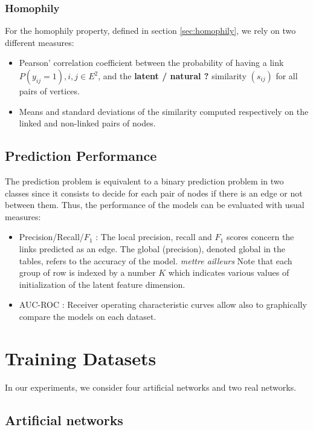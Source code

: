 \documentclass[a4paper, 12pt]{article}
\begin{document}
\subsubsection{Homophily}

For the homophily property, defined in section \ref{sec:homophily}, we rely on two different measures:

\begin{itemize}
    \item  Pearson' correlation coefficient between the probability of having a link $P(y_{ij}=1),  i, j \in E^2 $, and the  \textbf{latent / natural ?} similarity $(s_{ij})$ for all pairs of vertices. 
    \item  Means and standard deviations of the similarity computed respectively on the linked and non-linked pairs of nodes.
\end{itemize}

\subsection{Prediction Performance}
The prediction problem is equivalent to a binary prediction problem in two classes since it consists to decide for each pair of nodes if there is an edge or not between them. 
Thus, the performance of the models can be evaluated with usual measures:

\begin{itemize}

\item Precision/Recall/$F_1$ :  The local precision, recall and $F_1$ scores concern the links predicted as an edge.  The global (precision), denoted global in the tables, refers to the accuracy of the model. 
\textit{mettre ailleurs} Note that each group of row is indexed by  a number $K$ which indicates various values of initialization of the latent feature dimension.
\item AUC-ROC : Receiver operating characteristic curves allow also to graphically compare the  models on each dataset.
\end{itemize}

\section{Training Datasets}

In our experiments, we consider four artificial networks and two real networks.

\subsection{Artificial networks}
\end{document}
